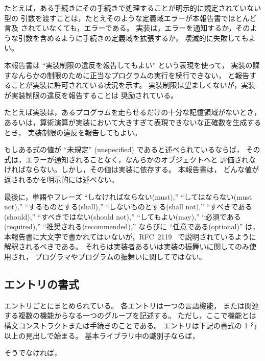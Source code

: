 たとえば，ある手続きにその手続きで処理することが明示的に規定されていない型の
引数を渡すことは，たとえそのような定義域エラーが本報告書でほとんど言及
されていなくても，エラーである。
実装は，エラーを通知するか，そのような引数を含めるように手続きの定義域を拡張するか，
壊滅的に失敗してもよい。

\vest 本報告書は ``実装制限の違反を報告してもよい'' という表現を使って，
実装の課すなんらかの制限のために正当なプログラムの実行を続行できない，
と報告することが実装に許可されている状況を示す。
実装制限は望ましくないが，実装が実装制限の違反を報告することは
奨励されている。

\vest たとえば実装は，あるプログラムを走らせるだけの十分な記憶領域がないとき，
あるいは，算術演算が実装において大きすぎて表現できないな正確数を生成するとき，
実装制限の違反を報告してもよい。

\vest もしある式の値が ``未規定'' (unspecified) であると述べられているならば，
その式は，エラーが通知されることなく，なんらかのオブジェクトへと
評価されなければならない。しかし，その値は実装に依存する。
本報告書は，
どんな値が返されるかを明示的には述べない。

\vest 最後に，単語やフレーズ ``しなければならない(must),'' ``してはならない(must not),''
``するものとする(shall),'' ``しないものとする(shall not),'' ``すべきである(should),''
``すべきではない(should not),'' ``してもよい(may),'' ``必須である(required),''
``推奨される(recommended),'' ならびに ``任意である(optional)''
は，本報告書に大文字で書かれてはいないが，RFC~2119~\cite{rfc2119} で説明されているように
解釈されるべきである。
それらは実装者あるいは実装の振舞いに関してのみ使用され，
プログラマやプログラムの振舞いに関してではない。



\subsection{エントリの書式}

エントリごとにまとめられている。
各エントリは一つの言語機能，
または関連する複数の機能からなる一つのグループを記述する。
ただし，ここで機能とは構文コンストラクトまたは手続きのことである。
エントリは下記の書式の 1 行以上の見出しで始まる。
基本ライブラリ中の識別子ならば，


\noindent{}\unpenalty

そうでなければ，

\noindent{}\unpenalty


